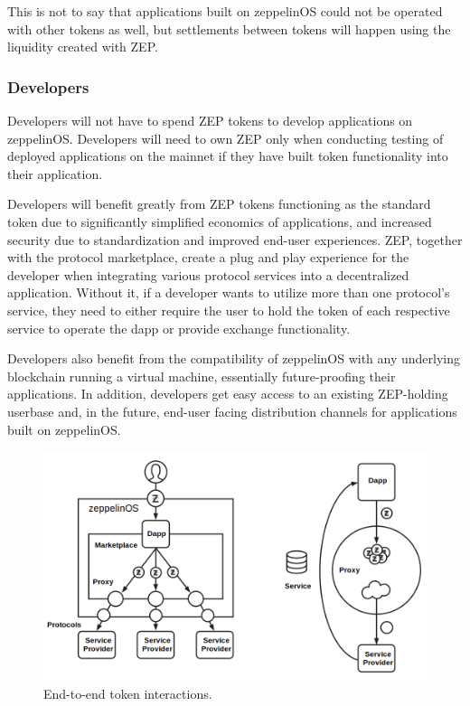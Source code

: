 \documentclass[]{article}
\makeatletter
\DeclareRobustCommand{\_}{%
  \leavevmode\vbox{%
    \hrule\@width.5em
          \@height-.26ex
          \@depth\dimexpr.26ex+.28pt\relax}}
\makeatother
\begin{document}
This is not to say that applications built on zeppelinOS could not be
operated with other tokens as well, but settlements between tokens will
happen using the liquidity created with ZEP.

\subsubsection{Developers}

Developers will not have to spend ZEP tokens to develop
applications on zeppelinOS. Developers will need to own ZEP only
when conducting testing of deployed applications on the mainnet if they
have built token functionality into their application.

Developers will benefit greatly from ZEP tokens functioning as the
standard token due to significantly simplified economics of
applications, and increased security due to standardization and improved
end-user experiences. ZEP, together with the protocol marketplace,
create a plug and play experience for the developer when integrating
various protocol services into a decentralized application. Without it,
if a developer wants to utilize more than one protocol's service,
they need to either require the user to hold the token of each
respective service to operate the dapp or provide exchange
functionality.

Developers also benefit from the compatibility of zeppelinOS with any
underlying blockchain running a virtual machine, essentially
future-proofing their applications. In addition, developers get easy
access to an existing ZEP-holding userbase and, in the future, end-user
facing distribution channels for applications built on zeppelinOS.

\begin{figure}
  \centering
  \includegraphics[width=0.75\linewidth]{images/image2}

  \caption{End-to-end token interactions.}
\end{figure}
\end{document}
